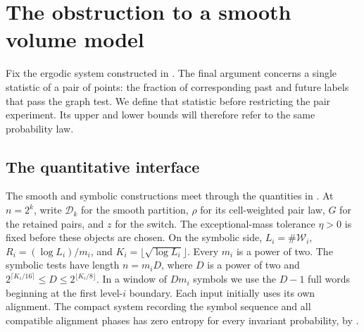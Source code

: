 \section{The obstruction to a smooth volume model}\label{sec:obstruction}

Fix the ergodic system constructed in .
The final argument concerns a single statistic of a pair of points:
the fraction of corresponding past and future labels that pass the
graph test. We define that statistic before restricting the pair
experiment. Its upper and lower bounds will therefore refer to the
same probability law.

\subsection*{The quantitative interface}
The smooth and symbolic constructions meet through the quantities in
. At $n=2^k$, write $\mathcal D_k$ for the smooth
partition, $\rho$ for its cell-weighted pair law, $G$ for the retained
pairs, and $z$ for the switch. The exceptional-mass tolerance $\eta>0$
is fixed before these objects are chosen. On the symbolic side, $L_i=\#\mathcal W_i$,
$R_i=(\log L_i)/m_i$, and $K_i=\lfloor\sqrt{\log L_i}\rfloor$.
Every $m_i$ is a power of two. The symbolic tests have length $n=m_iD$,
where $D$ is a power of two
and $2^{\lceil K_i/16\rceil}\le D\le2^{\lfloor K_i/8\rfloor}$.
In a window of $Dm_i$ symbols we use the $D-1$ full words beginning
at the first level-$i$ boundary. Each input initially uses its own
alignment. The compact system recording the symbol sequence and all
compatible alignment phases has zero entropy for every invariant
probability, by .

